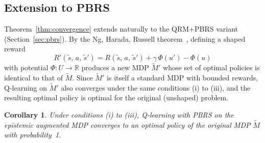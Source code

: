 \documentclass[11pt]{article}
\newtheorem{corollary}[theorem]{Corollary}
\begin{document}
\subsection{Extension to PBRS}

Theorem~\ref{thm:convergence} extends naturally to the QRM+PBRS variant (Section~\ref{sec:pbrs}).
By the Ng, Harada, Russell theorem~\cite{ng1999}, defining a shaped reward
\[
    R'(\tilde{s},\, a,\, \tilde{s}') = R(\tilde{s},\, a,\, \tilde{s}') + \gamma\,\Phi(u') - \Phi(u)
\]
with potential $\Phi : U \to \mathbb{R}$ produces a new MDP $\tilde{M}'$ whose set of optimal policies is identical to that of $\tilde{M}$.  Since $\tilde{M}'$ is itself a standard MDP with bounded rewards, Q-learning on $\tilde{M}'$ also converges under the same conditions (i) to (iii), and the resulting optimal policy is optimal for the original (unshaped) problem.

\begin{corollary}
Under conditions (i) to (iii), Q-learning with PBRS on the epistemic augmented MDP converges to an optimal policy of the original MDP $\tilde{M}$ with probability~1.
\end{corollary}



\end{document}

